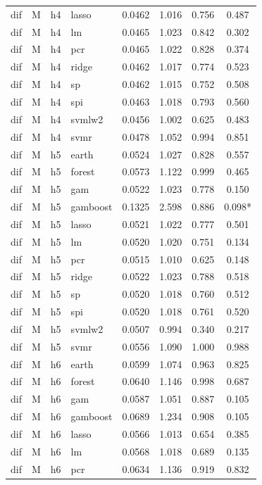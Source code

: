 \begin{ThreePartTable}
\begin{longtable}[t]{llclcccc}
dif & M & h4 & lasso & 0.0462 & 1.016 & 0.756 & 0.487\\
dif & M & h4 & lm & 0.0465 & 1.023 & 0.842 & 0.302\\
dif & M & h4 & pcr & 0.0465 & 1.022 & 0.828 & 0.374\\
dif & M & h4 & ridge & 0.0462 & 1.017 & 0.774 & 0.523\\
dif & M & h4 & sp & 0.0462 & 1.015 & 0.752 & 0.508\\
dif & M & h4 & spi & 0.0463 & 1.018 & 0.793 & 0.560\\
dif & M & h4 & svmlw2 & 0.0456 & 1.002 & 0.625 & 0.483\\
dif & M & h4 & svmr & 0.0478 & 1.052 & 0.994 & 0.851\\
\addlinespace
dif & M & h5 & earth & 0.0524 & 1.027 & 0.828 & 0.557\\
dif & M & h5 & forest & 0.0573 & 1.122 & 0.999 & 0.465\\
dif & M & h5 & gam & 0.0522 & 1.023 & 0.778 & 0.150\\
dif & M & h5 & gamboost & 0.1325 & 2.598 & 0.886 & 0.098*\\
dif & M & h5 & lasso & 0.0521 & 1.022 & 0.777 & 0.501\\
dif & M & h5 & lm & 0.0520 & 1.020 & 0.751 & 0.134\\
dif & M & h5 & pcr & 0.0515 & 1.010 & 0.625 & 0.148\\
dif & M & h5 & ridge & 0.0522 & 1.023 & 0.788 & 0.518\\
dif & M & h5 & sp & 0.0520 & 1.018 & 0.760 & 0.512\\
dif & M & h5 & spi & 0.0520 & 1.018 & 0.761 & 0.520\\
dif & M & h5 & svmlw2 & 0.0507 & 0.994 & 0.340 & 0.217\\
dif & M & h5 & svmr & 0.0556 & 1.090 & 1.000 & 0.988\\
\addlinespace
dif & M & h6 & earth & 0.0599 & 1.074 & 0.963 & 0.825\\
dif & M & h6 & forest & 0.0640 & 1.146 & 0.998 & 0.687\\
dif & M & h6 & gam & 0.0587 & 1.051 & 0.887 & 0.105\\
dif & M & h6 & gamboost & 0.0689 & 1.234 & 0.908 & 0.105\\
dif & M & h6 & lasso & 0.0566 & 1.013 & 0.654 & 0.385\\
dif & M & h6 & lm & 0.0568 & 1.018 & 0.689 & 0.135\\
dif & M & h6 & pcr & 0.0634 & 1.136 & 0.919 & 0.832\\

\end{longtable}
\end{ThreePartTable}
